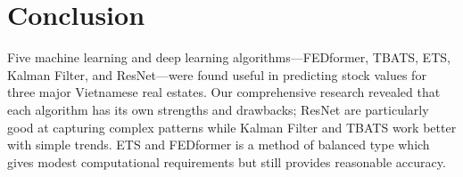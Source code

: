 \documentclass[conference]{IEEEtran}
\begin{document}


\newpage
\section{Conclusion}
Five machine learning and deep learning algorithms—FEDformer, TBATS, ETS, Kalman Filter, and ResNet—were found useful in predicting stock values for three major Vietnamese real estates. Our comprehensive research revealed that each algorithm has its own strengths and drawbacks; ResNet are particularly good at capturing complex patterns while Kalman Filter and TBATS work better with simple trends. ETS and FEDformer is a method of balanced type which gives modest computational requirements but still provides reasonable accuracy.
\end{document}
